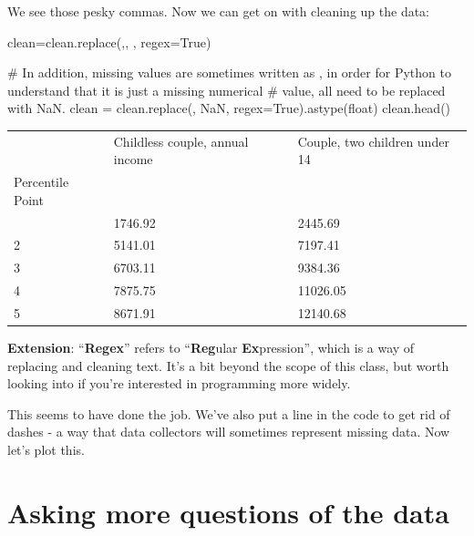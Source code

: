 \documentclass[
  letterpaper,
  DIV=11,
  numbers=noendperiod]{scrreprt}
\newenvironment{Shaded}{\begin{snugshade}}{\end{snugshade}}
\newcommand{\CommentTok}[1]{\textcolor[rgb]{0.37,0.37,0.37}{#1}}
\newcommand{\NormalTok}[1]{\textcolor[rgb]{0.00,0.23,0.31}{#1}}
\newcommand{\OperatorTok}[1]{\textcolor[rgb]{0.37,0.37,0.37}{#1}}
\newcommand{\StringTok}[1]{\textcolor[rgb]{0.13,0.47,0.30}{#1}}
\newcommand{\VariableTok}[1]{\textcolor[rgb]{0.07,0.07,0.07}{#1}}
\begin{document}
We see those pesky commas. Now we can get on with cleaning up the data:

\begin{Shaded}
\begin{Highlighting}[]
\NormalTok{clean}\OperatorTok{=}\NormalTok{clean.replace(}\StringTok{\textquotesingle{},\textquotesingle{}}\NormalTok{, }\StringTok{\textquotesingle{}\textquotesingle{}}\NormalTok{, regex}\OperatorTok{=}\VariableTok{True}\NormalTok{)}

\CommentTok{\# In addition, missing values are sometimes written as \textquotesingle{}{-}\textquotesingle{}, in order for Python to understand that it is just a missing numerical }
\CommentTok{\# value, all \textquotesingle{}{-}\textquotesingle{} need to be replaced with \textquotesingle{}NaN\textquotesingle{}.}
\NormalTok{clean }\OperatorTok{=}\NormalTok{ clean.replace(}\StringTok{\textquotesingle{}{-}\textquotesingle{}}\NormalTok{, }\StringTok{\textquotesingle{}NaN\textquotesingle{}}\NormalTok{, regex}\OperatorTok{=}\VariableTok{True}\NormalTok{).astype(}\StringTok{\textquotesingle{}float\textquotesingle{}}\NormalTok{)}
\NormalTok{clean.head()}
\end{Highlighting}
\end{Shaded}

\begin{longtable}[]{@{}lll@{}}
\toprule\noalign{}
& Childless couple, annual income & Couple, two children under 14 \\
Percentile Point & & \\
\midrule\noalign{}
\endhead
\bottomrule\noalign{}
\endlastfoot
1 & 1746.92 & 2445.69 \\
2 & 5141.01 & 7197.41 \\
3 & 6703.11 & 9384.36 \\
4 & 7875.75 & 11026.05 \\
5 & 8671.91 & 12140.68 \\
\end{longtable}

\textbf{Extension}: ``\textbf{Regex}'' refers to ``\textbf{Reg}ular
\textbf{Ex}pression'', which is a way of replacing and cleaning text.
It's a bit beyond the scope of this class, but worth looking into if
you're interested in programming more widely.

This seems to have done the job. We've also put a line in the code to
get rid of dashes - a way that data collectors will sometimes represent
missing data. Now let's plot this.

\hypertarget{asking-more-questions-of-the-data}{%
\section{Asking more questions of the
data}\label{asking-more-questions-of-the-data}}
\end{document}
